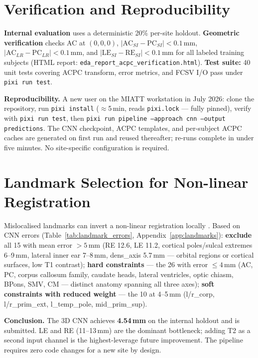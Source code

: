 \documentclass[11pt,letterpaper]{article}
\begin{document}
\section{Verification and Reproducibility}
\label{sec:verif}

\textbf{Internal evaluation} uses a deterministic 20\% per-site holdout.
\textbf{Geometric verification} checks AC at $(0,0,0)$, $|\text{AC}_{SI}-\text{PC}_{SI}|<0.1\,\text{mm}$,
$|\text{AC}_{LR}-\text{PC}_{LR}|<0.1\,\text{mm}$, and $|\text{LE}_{SI}-\text{RE}_{SI}|<0.1\,\text{mm}$
for all labeled training subjects (HTML report: \texttt{eda\_report\_acpc\_verification.html}).
\textbf{Test suite:} 40 unit tests covering ACPC transform, error metrics, and FCSV I/O
pass under \texttt{pixi run test}.

\textbf{Reproducibility.}
A new user on the MIATT workstation in July 2026: clone the repository, run
\texttt{pixi install} ($\approx$5\,min, reads \texttt{pixi.lock} — fully pinned), verify with
\texttt{pixi run test}, then \texttt{pixi run pipeline --approach cnn --output predictions}.
The CNN checkpoint, ACPC templates, and per-subject ACPC caches are generated on first run
and reused thereafter; re-runs complete in under five minutes.
No site-specific configuration is required.

\section{Landmark Selection for Non-linear Registration}
\label{sec:landmark_selection}

Mislocalised landmarks can invert a non-linear registration locally \cite{rohlfing2012image}.
Based on CNN errors (Table~\ref{tab:landmark_errors}, Appendix~\ref{app:landmarks}):
\textbf{exclude} all 15 with mean error $>5$\,mm (RE 12.6, LE 11.2, cortical poles/sulcal extremes
6--9\,mm, lateral inner ear 7--8\,mm, dens\_axis 5.7\,mm — orbital regions or cortical surfaces,
low T1 contrast);
\textbf{hard constraints} — the 26 with error $\leq4$\,mm (AC, PC, corpus callosum family,
caudate heads, lateral ventricles, optic chiasm, BPons, SMV, CM — distinct anatomy spanning all
three axes);
\textbf{soft constraints with reduced weight} — the 10 at 4--5\,mm
(l/r\_corp, l/r\_prim\_ext, l\_temp\_pole, mid\_prim\_sup).

\textbf{Conclusion.}
The 3D CNN achieves \textbf{4.54\,mm} on the internal holdout and is submitted.
LE and RE (11--13\,mm) are the dominant bottleneck; adding T2 as a second input channel is the
highest-leverage future improvement.
The pipeline requires zero code changes for a new site by design.
\end{document}
